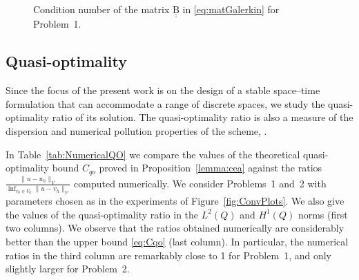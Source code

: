 \documentclass[a4paper]{article}
\theoremstyle{plain}
\theoremstyle{definition}
\newcommand{\mat}[1]{\underline{\underline{\mathrm{#1}}}}
\newcommand{\logLogCondSlopeTriangle}[5]
{
    \pgfplotsextra
    {
        \pgfkeysgetvalue{/pgfplots/xmin}{\xmin}
        \pgfkeysgetvalue{/pgfplots/xmax}{\xmax}
        \pgfkeysgetvalue{/pgfplots/ymin}{\ymin}
        \pgfkeysgetvalue{/pgfplots/ymax}{\ymax}

        \pgfmathsetmacro{\xArel}{#1}
        \pgfmathsetmacro{\yArel}{#3}
        \pgfmathsetmacro{\xBrel}{#1-#2}
        \pgfmathsetmacro{\yBrel}{\yArel}
        \pgfmathsetmacro{\xCrel}{\xArel}

        \pgfmathsetmacro{\lnxB}{\xmin*(1-(#1-#2))+\xmax*(#1-#2)}
        \pgfmathsetmacro{\lnxA}{\xmin*(1-#1)+\xmax*#1}
        \pgfmathsetmacro{\lnyA}{\ymin*(1-#3)+\ymax*#3}
        \pgfmathsetmacro{\lnyC}{\lnyA+#4*(\lnxA-\lnxB)}
        \pgfmathsetmacro{\yCrel}{\lnyC-\ymin)/(\ymax-\ymin)}
        \pgfmathsetmacro{\rateText}{abs(#4)}

        \coordinate (A) at (rel axis cs:\xArel,\yArel);
        \coordinate (B) at (rel axis cs:\xBrel,\yBrel);
        \coordinate (C) at (rel axis cs:\xCrel,\yCrel);

        \draw[#5]   (A)-- node[pos=0.5,anchor=north] {1}
        (B)--
        (C)-- node[pos=0.5,anchor=east] {\rateText}
        cycle;
    }
}
\begin{document}
\begin{figure}[htb]
\centering
\caption{Condition number of the matrix $\mat B$ in \eqref{eq:matGalerkin} for Problem~1.
}
\label{fig:CondNumPlots}
\end{figure}

\subsection{Quasi-optimality}
Since the focus of the present work is on the design of a stable space--time formulation that can accommodate a range of discrete spaces, we study the quasi-optimality ratio of its solution.
The quasi-optimality ratio is also a measure of the dispersion and numerical pollution properties of the scheme, \cite{Moiola2014}.

In Table~\ref{tab:NumericalQO} we compare the values of the theoretical quasi-optimality bound $C_{qo}$ proved in Proposition~\ref{lemma:cea} against the ratios $\frac{\|u-u_h\|_{V}}{\inf_{v_h\in V_h}\|u-v_h\|_{V}}$ computed numerically.
We consider Problems~1 and~2 with parameters chosen as in the experiments of Figure~\ref{fig:ConvPlots}.
We also give the values of the quasi-optimality ratio in the $L^2(Q)$ and $H^1(Q)$ norms (first two columns).
We observe that the ratios obtained numerically are considerably better than the upper bound \eqref{eq:Cqo} (last column).
In particular, the numerical ratios in the third column are remarkably close to 1 for Problem~1, and only slightly larger for Problem~2.
\end{document}
